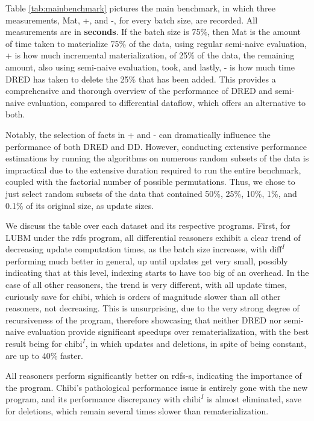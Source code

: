 \documentclass[sigconf,screen,review,natbib]{acmart}
\theoremstyle{definition}
\begin{document}
Table \ref{tab:mainbenchmark} pictures the main benchmark, in which three measurements, Mat, +, and -, for every batch size, are recorded. All measurements are in
\textbf{seconds}. If the batch size is 75\%, then Mat is the amount of time taken to materialize 75\% of the data, using regular semi-naive evaluation, + is how much
incremental materialization, of 25\% of the data, the remaining amount, also using semi-naive evaluation, took, and lastly, - is how much time DRED has taken to delete
the 25\% that has been added. This provides a comprehensive and thorough overview of the performance of DRED and semi-naive evaluation, compared to differential
dataflow, which offers an alternative to both.

Notably, the selection of facts in + and - can dramatically influence the performance of both DRED and DD. However, conducting extensive performance
estimations by running the algorithms on numerous random subsets of the data is impractical due to the extensive duration required to run the entire benchmark, coupled
with the factorial number of possible permutations. Thus, we chose to just select random subsets of the data that contained 50\%, 25\%, 10\%, 1\%, and 0.1\% of its
original size, as update sizes.

We discuss the table over each dataset and its respective programs. First, for LUBM under the rdfs program, all differential reasoners exhibit a clear trend of decreasing
update computation times, as the batch size increases, with $\text{diff}^{I}$ performing much better in general, up until updates get very small, possibly indicating
that at this level, indexing starts to have too big of an overhead. In the case of all other reasoners, the trend is very different, with all update times, curiously save for
chibi, which is orders of magnitude slower than all other reasoners,  not decreasing. This is unsurprising, due to the very strong degree of recursiveness of the
program, therefore showcasing that neither DRED nor semi-naive evaluation provide significant speedups over rematerialization, with the best result being for $\text{chibi}^I$, in
which updates and deletions, in spite of being constant, are up to 40\% faster.

All reasoners perform significantly better on rdfs-s, indicating the importance of the program. Chibi's pathological performance issue is entirely gone with the new program, and
its performance discrepancy with $\text{chibi}^{I}$ is almost eliminated, save for deletions, which remain several times slower than rematerialization.
\end{document}
